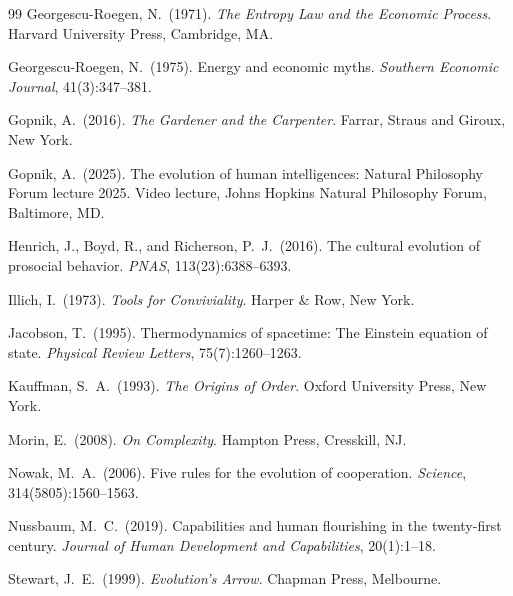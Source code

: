 \documentclass[12pt,a4paper]{article}
\theoremstyle{definition}
\begin{document}
\begin{thebibliography}{99}
Georgescu-Roegen, N.\ (1971).
\textit{The Entropy Law and the Economic Process}.
Harvard University Press, Cambridge, MA.

Georgescu-Roegen, N.\ (1975).
Energy and economic myths.
\textit{Southern Economic Journal}, 41(3):347--381.

Gopnik, A.\ (2016).
\textit{The Gardener and the Carpenter}.
Farrar, Straus and Giroux, New York.

Gopnik, A.\ (2025).
The evolution of human intelligences: Natural Philosophy Forum lecture 2025.
Video lecture, Johns Hopkins Natural Philosophy Forum, Baltimore, MD.

Henrich, J., Boyd, R., and Richerson, P.\ J.\ (2016).
The cultural evolution of prosocial behavior.
\textit{PNAS}, 113(23):6388--6393.

Illich, I.\ (1973).
\textit{Tools for Conviviality}.
Harper \& Row, New York.

Jacobson, T.\ (1995).
Thermodynamics of spacetime: The Einstein equation of state.
\textit{Physical Review Letters}, 75(7):1260--1263.

Kauffman, S.\ A.\ (1993).
\textit{The Origins of Order}.
Oxford University Press, New York.

Morin, E.\ (2008).
\textit{On Complexity}.
Hampton Press, Cresskill, NJ.

Nowak, M.\ A.\ (2006).
Five rules for the evolution of cooperation.
\textit{Science}, 314(5805):1560--1563.

Nussbaum, M.\ C.\ (2019).
Capabilities and human flourishing in the twenty-first century.
\textit{Journal of Human Development and Capabilities}, 20(1):1--18.

Stewart, J.\ E.\ (1999).
\textit{Evolution's Arrow}.
Chapman Press, Melbourne.

\end{thebibliography}
\end{document}
